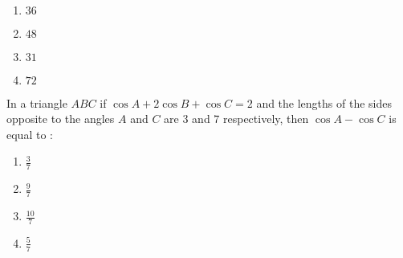 	    \hfill{}\\
    \begin{enumerate}
        \item $36$
        \item $48$
        \item $31$
        \item $72$
    \end{enumerate}
    \item In a triangle $ABC$ if $\cos A+2\cos B+\cos C=2$ and the lengths of the sides opposite to the angles $A$ and $C$ are $3$ and $7$ respectively, then $\cos A-\cos C$ is equal to $:$
	    \hfill{}\\
    \begin{enumerate}
        \item $\frac{3}{7}$
        \item $\frac{9}{7}$
        \item $\frac{10}{7}$
        \item $\frac{5}{7}$
    \end{enumerate}
